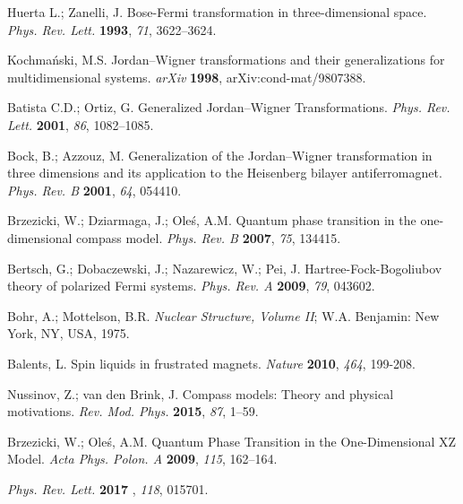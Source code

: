 \documentclass[twocolumn,floats,superscriptaddress]{revtex4}
\begin{document}
\begin{thebibliography}{999}
Huerta L.; Zanelli, J. Bose-Fermi transformation in three-dimensional space. \emph{Phys. Rev. Lett.} {\bf 1993}, {\it 71}, 3622--3624.

Kochma\'{n}ski, M.S. Jordan--Wigner transformations and their generalizations for multidimensional systems. \emph{arXiv} {\bf1998}, arXiv:cond-mat/9807388.

Batista C.D.; Ortiz, G. Generalized Jordan--Wigner Transformations. \emph{Phys. Rev. Lett.} {\bf 2001}, {\it 86}, 1082--1085.

Bock, B.; Azzouz, M. Generalization of the Jordan--Wigner transformation in three dimensions and its application to the Heisenberg bilayer antiferromagnet. \emph{Phys. Rev. B} {\bf2001}, {\it 64}, 054410.

Brzezicki, W.; Dziarmaga, J.; Ole\'{s}, A.M. Quantum phase transition in the one-dimensional compass model. \emph{Phys. Rev. B} {\bf 2007}, {\it 75}, 134415.

 {Bertsch, G.; Dobaczewski, J.; Nazarewicz, W.; Pei, J. Hartree-Fock-Bogoliubov theory of polarized Fermi systems. \emph{Phys. Rev. A} {\bf 2009}, {\it 79}, 043602.}

 {Bohr, A.; Mottelson, B.R. \emph{Nuclear Structure, Volume II}; W.A. Benjamin: New York, NY, USA, 1975.}

 {Balents, L. Spin liquids in frustrated magnets. \emph{Nature} {\bf2010}, {\it464}, 199-208.}

Nussinov, Z.; van den Brink, J. Compass models: Theory and physical motivations. \emph{Rev. Mod. Phys.} {\bf 2015}, {\it87}, 1--59.

 {Brzezicki, W.; Ole\'{s}, A.M. Quantum Phase Transition in the One-Dimensional XZ Model. \emph{Acta Phys. Polon. A} {\bf2009}, {\it115}, 162--164.}

 \emph{Phys. Rev. Lett.} {\bf 2017 }, {\it118}, 015701.


\end{thebibliography}
\end{document}
